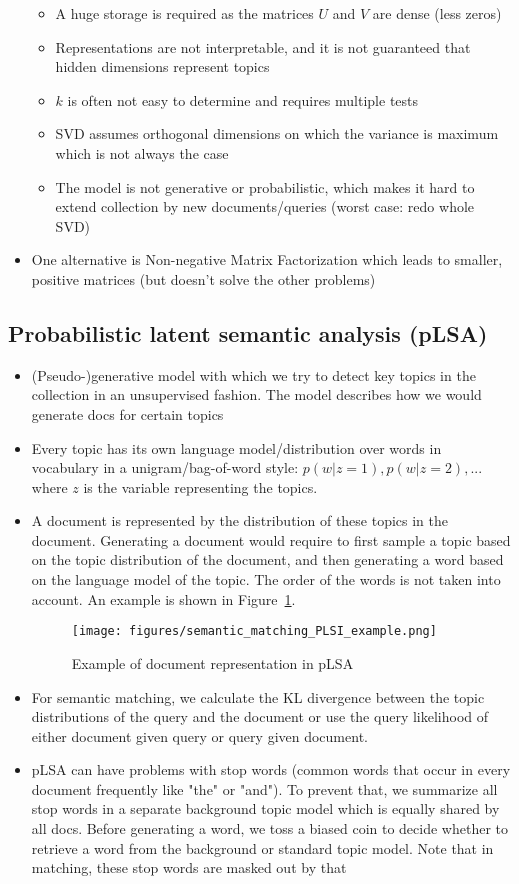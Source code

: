 \begin{itemize}
\begin{itemize}
		\item A huge storage is required as the matrices $U$ and $V$ are dense (less zeros)
		\item Representations are not interpretable, and it is not guaranteed that hidden dimensions represent topics
		\item $k$ is often not easy to determine and requires multiple tests
		\item SVD assumes orthogonal dimensions on which the variance is maximum which is not always the case
		\item The model is not generative or probabilistic, which makes it hard to extend collection by new documents/queries (worst case: redo whole SVD)
	\end{itemize}
	\item One alternative is Non-negative Matrix Factorization which leads to smaller, positive matrices (but doesn't solve the other problems)
\end{itemize}
\subsection{Probabilistic latent semantic analysis (pLSA)}
\begin{itemize}
	\item (Pseudo-)generative model with which we try to detect key topics in the collection in an unsupervised fashion. The model describes how we would generate docs for certain topics
	\item Every topic has its own language model/distribution over words in vocabulary in a unigram/bag-of-word style: $p(w|z=1), p(w|z=2),...$ where $z$ is the variable representing the topics. 
	\item A document is represented by the distribution of these topics in the document. Generating a document would require to first sample a topic based on the topic distribution of the document, and then generating a word based on the language model of the topic. The order of the words is not taken into account. An example is shown in Figure~\ref{img:semantic_matching_pLSA_example}.
	\begin{figure}[ht]
		\centering
		\texttt{[image: figures/semantic\_matching\_PLSI\_example.png]}
		\caption{Example of document representation in pLSA}
		\label{img:semantic_matching_pLSA_example}
	\end{figure}
	\item For semantic matching, we calculate the KL divergence between the topic distributions of the query and the document or use the query likelihood of either document given query or query given document.
	\item pLSA can have problems with stop words (common words that occur in every document frequently like "the" or "and"). To prevent that, we summarize all stop words in a separate background topic model which is equally shared by all docs. Before generating a word, we toss a biased coin to decide whether to retrieve a word from the background or standard topic model. Note that in matching, these stop words are masked out by that
\end{itemize}
